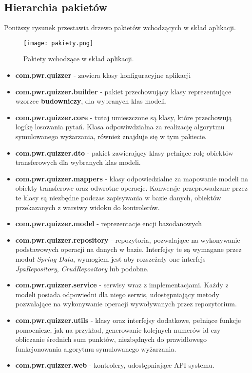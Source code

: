 \documentclass[a4paper, titlepage]{article}
\begin{document}
\subsection{Hierarchia pakietów}
Poniższy rysunek przestawia drzewo pakietów wchodzących w skład aplikacji.

      \begin{figure}[H]
      \centering
      \texttt{[image: pakiety.png]}
      \caption{Pakiety wchodzące w skład aplikacji.}
  \end{figure}

\begin{itemize}
\item \textbf{com.pwr.quizzer} - zawiera klasy konfiguracyjne aplikacji
\item \textbf{com.pwr.quizzer.builder} - pakiet przechowujący klasy reprezentujące wzorzec \textbf{budowniczy}, dla wybranych klas modeli.
\item \textbf{com.pwr.quizzer.core} - tutaj umieszczone są klasy, które przechowują logikę losowania pytań. Klasa odpowiwdzialna za realizację algorytmu symulowanego wyżarzania, również znajduje się w tym pakiecie.
\item \textbf{com.pwr.quizzer.dto} - pakiet zawierający klasy pełniące rolę obiektów transferowych dla wybranych klas modeli.
\item \textbf{com.pwr.quizzer.mappers} - klasy odpowiedzialne za mapowanie modeli na obiekty transferowe oraz odwrotne operacje. Konwersje przeprowadzane przez te klasy są niezbędne podczas zapisywania w bazie danych, obiektów przekazanych z warstwy widoku do kontrolerów.
\item \textbf{com.pwr.quizzer.model} - reprezentacje encji bazodanowych
\item \textbf{com.pwr.quizzer.repository} - repozytoria, pozwalające na wykonywanie podstawowych operacji na danych w bazie. Interfejsy te są wymagane przez moduł \textit{Spring Data}, wymogiem jest aby rozszeżały one interfejs \textit{JpaRepository}, \textit{CrudRepository} lub podobne.
\item \textbf{com.pwr.quizzer.service} - serwisy wraz z implementacjami. Każdy z modeli posiada odpowiedni dla niego serwis, udostępniający metody pozwalające na wykonywanie operacji wywoływanych przez repozytorium.
\item \textbf{com.pwr.quizzer.utils} - klasy oraz interfejsy dodatkowe, pełniące funkcje pomocnicze, jak na przykład, generowanie kolejnych numerów id czy obliczanie średnich sum punktów, niezbędnych do prawidłowego funkcjonowania algorytmu symulowanego wyżarzania.
\item \textbf{com.pwr.quizzer.web} - kontrolery, udostępniające API systemu.

\end{itemize}
\end{document}

